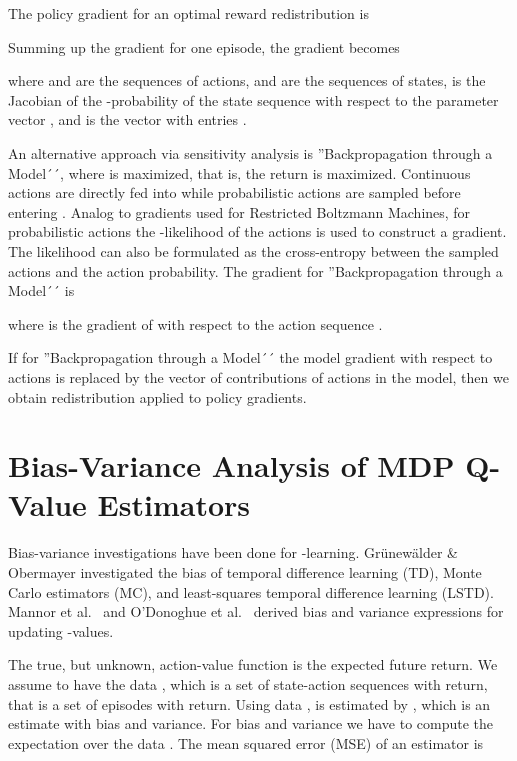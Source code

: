 \documentclass{article}
\begin{document}
\begin{appendices}
The policy gradient for an optimal reward redistribution is
 
Summing up the gradient for one episode, the gradient becomes 
 
where   
and  are the sequences of actions, 
 and  
are the sequences of states,
 is the Jacobian of the -probability of the 
state sequence with respect to the parameter vector ,
and  is the vector with
entries . 

An alternative approach via sensitivity analysis is ''Backpropagation through a Model´´, 
where  is maximized, that is, the return is maximized.
Continuous actions are directly fed into  while probabilistic actions are 
sampled before entering . Analog to gradients used for Restricted Boltzmann Machines,
for probabilistic actions the -likelihood of the actions is used to construct a gradient.
The likelihood can also be formulated as the cross-entropy
between the sampled actions and the action probability.
The gradient for ''Backpropagation through a Model´´ is
 
where  is the gradient of  with respect to the action sequence . 

If for ''Backpropagation through a Model´´ 
the model gradient with respect to actions
is replaced by the vector of contributions of actions in the model, 
then we obtain 
redistribution applied to policy gradients.

\section{Bias-Variance Analysis of MDP Q-Value Estimators}
\label{sec:AbiasVariance}

Bias-variance investigations have been done for -learning.
Gr{\"{u}}new{\"{a}}lder \& Obermayer \cite{Grunewalder:11}
investigated the bias of temporal
difference learning (TD), Monte Carlo estimators (MC), and least-squares temporal
difference learning (LSTD).
Mannor et al.\ \cite{Mannor:07} and O'Donoghue et al.\ \cite{ODonoghue:17}
derived bias and variance expressions for updating
-values.

The true, but unknown, action-value function 
is the expected future return.
We assume to have the data ,
which is a set of state-action sequences with return,
that is a set of episodes with return.
Using data ,  is 
estimated by , which
is an estimate with bias and variance.
For bias and variance we have to compute
the expectation  over the data .
The mean squared error (MSE) of an estimator  is


\end{appendices}
\end{document}
